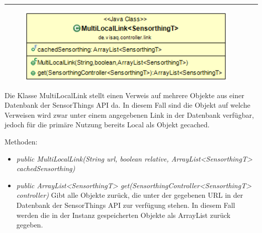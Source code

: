 \rule{\textwidth}{0.4pt}
\begin{minipage}{0.4\textwidth}
    \begin{figure}[H]
        {\centering\includegraphics[width=0.95\textwidth]{media/backend/controller/classes/MultiLocalLink.png}}
    \end{figure}
    \end{minipage} \hfill
\begin{minipage}{0.6\textwidth}
    Die Klasse MultiLocalLink stellt einen Verweis auf mehrere Objekte aus einer Datenbank der \gls{SensorThings API} da.
    In diesem Fall sind die Objekt auf welche Verweisen wird zwar unter einem angegebenen Link in der Datenbank verfügbar, jedoch für die primäre Nutzung bereits Local als Objekt gecached.
\end{minipage}

Methoden:
\begin{itemize}
    \item \emph{public MultiLocalLink(String url, boolean relative, ArrayList<SensorthingT> cachedSensorthing)}
    \relativeDescription
    \item \emph{public ArrayList<SensorthingT> get(SensorthingController<SensorthingT> controller)}
    Gibt alle Objekte zurück, die unter der gegebenen URL in der Datenbank der \gls{SensorThings API} zur verfügung stehen.
    In diesem Fall werden die in der Instanz gespeicherten Objekte als ArrayList zurück gegeben.
\end{itemize}


